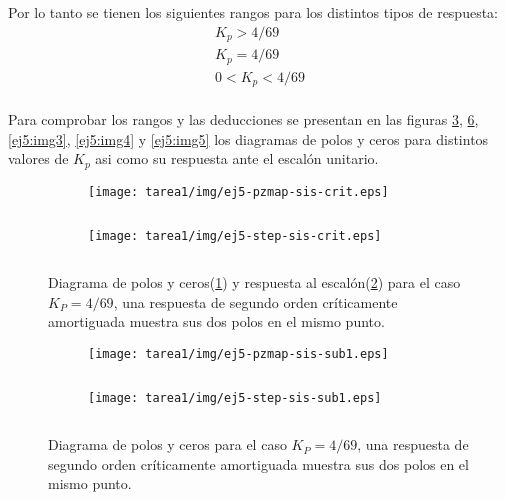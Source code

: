 \begin{ejercicio}
  Por lo tanto se tienen los siguientes rangos para los distintos tipos de respuesta:
  \begin{align*}
    \tag{sobreamortiguada}
    K_p > 4/69
    \\
    \tag{críticamente amortiguada}
    K_p = 4/69
    \\
    \tag{subamortiguada}
    0 < K_p < 4/69
    \\
  \end{align*}

  Para comprobar los rangos y las deducciones se presentan en las figuras \ref{ej5:img1}, \ref{ej5:img2}, \ref{ej5:img3}, \ref{ej5:img4} y \ref{ej5:img5} los diagramas de polos y ceros para distintos valores de $K_p$ asi como su respuesta ante el escalón unitario.

    \begin{figure}[H]
      \centering
      \begin{subfigure}{0.48\textwidth}
        \centering
        \texttt{[image: tarea1/img/ej5-pzmap-sis-crit.eps]}
        \caption{$\quad$}
        \label{ej5:img1:a}
      \end{subfigure}
      \begin{subfigure}{0.48\textwidth}
        \centering
        \texttt{[image: tarea1/img/ej5-step-sis-crit.eps]}
        \caption{$\quad$}
        \label{ej5:img1:b}
      \end{subfigure}
      \caption{Diagrama de polos y ceros(\ref{ej5:img1:a}) y respuesta al escalón(\ref{ej5:img1:b}) para el caso $K_P = 4/69$, una respuesta de segundo orden críticamente amortiguada muestra sus dos polos en el mismo punto.}
      \label{ej5:img1}
    \end{figure}
    
    \begin{figure}[H]
      \centering
      \begin{subfigure}{0.48\textwidth}
        \centering
        \texttt{[image: tarea1/img/ej5-pzmap-sis-sub1.eps]}
        \caption{$\quad$}
        \label{ej5:img2:a}
      \end{subfigure}
      \begin{subfigure}{0.48\textwidth}
        \centering
        \texttt{[image: tarea1/img/ej5-step-sis-sub1.eps]}
        \caption{$\quad$}
        \label{ej5:img2:b}
      \end{subfigure}
      \caption{Diagrama de polos y ceros para el caso $K_P = 4/69$, una respuesta de segundo orden críticamente amortiguada muestra sus dos polos en el mismo punto.}
      \label{ej5:img2}
    \end{figure}


\end{ejercicio}
